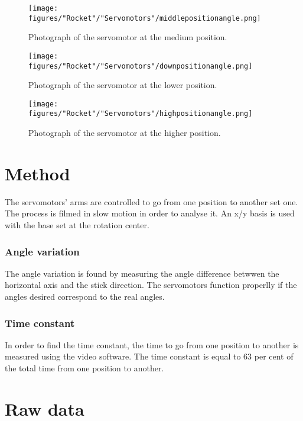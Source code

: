 \begin{figure} [htbp]
	\centering
	\texttt{[image: figures/"Rocket"/"Servomotors"/middlepositionangle.png]}
	\caption{Photograph of the servomotor at the medium position.} \label{fig:ServoInitialPosition}
\end{figure}

\begin{figure} [htbp]
	\centering
	\texttt{[image: figures/"Rocket"/"Servomotors"/downpositionangle.png]}
	\caption{Photograph of the servomotor at the lower position.} \label{fig:ServoLowPosition}
\end{figure}

\begin{figure} [htbp]
	\centering
	\texttt{[image: figures/"Rocket"/"Servomotors"/highpositionangle.png]}
	\caption{Photograph of the servomotor at the higher position.} \label{fig:ServoHighPosition}
\end{figure}


	\section*{Method}
	
 The servomotors' arms are controlled to go from one position to another set one. The process is filmed in slow motion in order to analyse it. An x/y basis is used with the base set at the rotation center.
  
		\subsubsection*{Angle variation}
		
The angle variation is found by measuring the angle difference betwwen the horizontal axis and the stick direction. The servomotors function properlly if the angles desired correspond to the real angles.

		\subsubsection*{Time constant}
		
In order to find the time constant, the time to go from one position to another is measured using the video software. The time constant is equal to $63$ per cent of the total time from one position to another. 



	\section*{Raw data}
	
